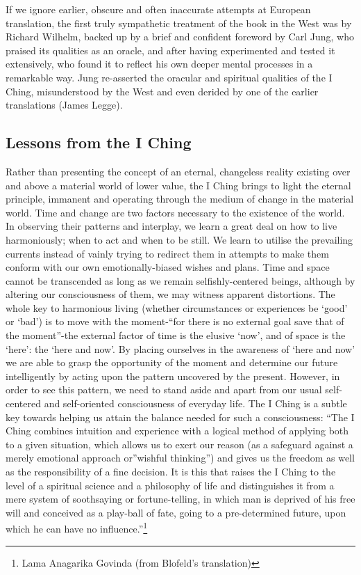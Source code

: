 \documentclass[11pt]{book}
\begin{document}
If we ignore earlier, obscure and often inaccurate attempts at European translation, the first truly sympathetic treatment of the book in the West was by Richard Wilhelm, backed up by a brief and confident foreword by Carl Jung, who praised its qualities as an oracle, and after having experimented and tested it extensively, who found it to reflect his own deeper mental processes in a remarkable way. Jung re-asserted the oracular and spiritual qualities of the I Ching, misunderstood by the West and even derided by one of the earlier translations (James Legge).

\hypertarget{lessons-from-the-i-ching}{%
\subsection{Lessons from the I Ching}\label{lessons-from-the-i-ching}}

Rather than presenting the concept of an eternal, changeless reality existing over and above a material world of lower value, the I Ching brings to light the eternal principle, immanent and operating through the medium of change in the material world. Time and change are two factors necessary to the existence of the world. In observing their patterns and interplay, we learn a great deal on how to live harmoniously; when to act and when to be still. We learn to utilise the prevailing currents instead of vainly trying to redirect them in attempts to make them conform with our own emotionally-biased wishes and plans. Time and space cannot be transcended as long as we remain selfishly-centered beings, although by altering our consciousness of them, we may witness apparent distortions. The whole key to harmonious living (whether circumstances or experiences be `good' or `bad') is to move with the moment-``for there is no external goal save that of the moment''-the external factor of time is the elusive `now', and of space is the `here': the `here and now'. By placing ourselves in the awareness of `here and now' we are able to grasp the opportunity of the moment and determine our future intelligently by acting upon the pattern uncovered by the present. However, in order to see this pattern, we need to stand aside and apart from our usual self-centered and self-oriented consciousness of everyday life. The I Ching is a subtle key towards helping us attain the balance needed for such a consciousness: ``The I Ching combines intuition and experience with a logical method of applying both to a given situation, which allows us to exert our reason (as a safeguard against a merely emotional approach or''wishful thinking'') and gives us the freedom as well as the responsibility of a fine decision. It is this that raises the I Ching to the level of a spiritual science and a philosophy of life and distinguishes it from a mere system of soothsaying or fortune-telling, in which man is deprived of his free will and conceived as a play-ball of fate, going to a pre-determined future, upon which he can have no influence.''\footnote{Lama Anagarika Govinda (from Blofeld's translation)}
\end{document}
